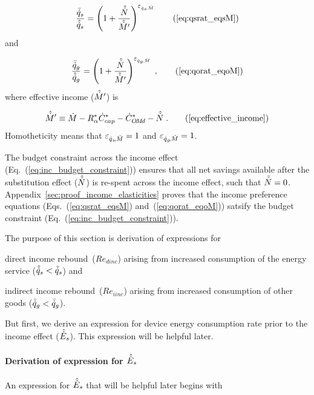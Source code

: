 \begin{equation}
  \incprefseqn \tag{\ref{eq:qsrat_eqsM}}
\end{equation}
%
and

\begin{equation}
  \incprefoeqn \; , \tag{\ref{eq:qorat_eqoM}}
\end{equation}
%
where effective income ($\hat{\dot{M}}^\prime$) is

\begin{equation}
  \effinceqn{} \; . \tag{\ref{eq:effective_income}}
\end{equation}
%
Homotheticity means that $\varepsilon_{\dot{q}_s\!,\dot{M}} = 1$ and $\varepsilon_{\dot{q}_g\!,\dot{M}} = 1$.

The budget constraint across the income effect (Eq.~(\ref{eq:inc_budget_constraint})) 
ensures that all net savings available after the substitution effect ($\hat{\dot{N}}$) 
is re-spent across the income effect, 
such that $\bar{\dot{N}} = 0$.
Appendix~\ref{sec:proof_income_elasticities} proves that
the income preference equations (Eqs.~(\ref{eq:qsrat_eqsM}) and~(\ref{eq:qorat_eqoM})) 
satsify the budget constraint (Eq.~(\ref{eq:inc_budget_constraint})).

The purpose of this section is derivation of expressions for 
%
\begin{enumerate*}[label={(\roman*)}]
	
  \item direct income rebound~($Re_{dinc}$) 
        arising from increased consumption of the energy service 
        ($\hat{\dot{q}}_s < \bar{\dot{q}}_s$) and
  
  \item indirect income rebound~($Re_{iinc}$) 
        arising from increased consumption of other goods 
        ($\hat{\dot{q}}_g < \bar{\dot{q}}_g$).
    
\end{enumerate*}

But first, we derive an expression 
for device energy consumption rate prior to the income effect 
($\hat{\dot{E}}_s$).
This expression will be helpful later.

\paragraph{Derivation of expression for $\hat{\dot{E}}_s$}
\label{sec:E_dot_s_hat_expression}

An expression for $\hat{\dot{E}}_s$ that will be helpful later
begins with

